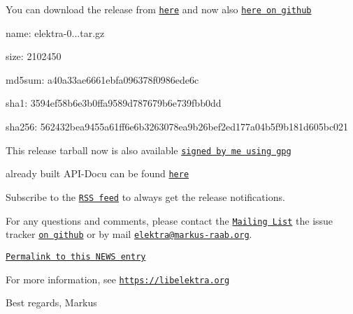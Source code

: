 You can download the release from \href{https://www.libelektra.org/ftp/elektra/releases/elektra-0.8.12.tar.gz}{\tt here} and now also \href{https://github.com/ElektraInitiative/ftp/tree/master/releases/elektra-0.8.12.tar.gz}{\tt here on github}


\begin{DoxyItemize}
\item name\+: elektra-\/0...\+tar.\+gz
\item size\+: 2102450
\item md5sum\+: a40a33ae6661ebfa096378f0986ede6c
\item sha1\+: 3594ef58b6e3b0ffa9589d787679b6e739fbb0dd
\item sha256\+: 562432bea9455a61ff6e6b3263078ea9b26bef2ed177a04b5f9b181d605bc021
\end{DoxyItemize}

This release tarball now is also available \href{https://www.libelektra.org/ftp/elektra/releases/elektra-0.8.12.tar.gz.gpg}{\tt signed by me using gpg}

already built A\+P\+I-\/\+Docu can be found \href{https://doc.libelektra.org/api/0.8.12/html/}{\tt here}

Subscribe to the \href{https://doc.libelektra.org/news/feed.rss}{\tt R\+SS feed} to always get the release notifications.

For any questions and comments, please contact the \href{https://lists.sourceforge.net/lists/listinfo/registry-list}{\tt Mailing List} the issue tracker \href{https://git.libelektra.org/issues}{\tt on github} or by mail \href{mailto:elektra@markus-raab.org}{\tt elektra@markus-\/raab.\+org}.

\href{https://doc.libelektra.org/news/98770541-32a1-486a-98a1-d02f26afc81a.html}{\tt Permalink to this N\+E\+WS entry}

For more information, see \href{https://libelektra.org}{\tt https\+://libelektra.\+org}

Best regards, Markus 